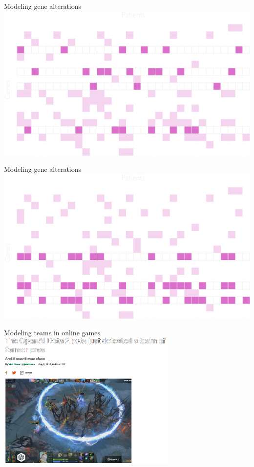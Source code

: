 \documentclass[mathserif]{beamer}
\begin{document}
\begin{frame}{Modeling gene alterations}
\includegraphics[width=\textwidth]{figures/grid_genes_muex.pdf}
\end{frame}


\begin{frame}{Modeling gene alterations}
\includegraphics[width=\textwidth]{figures/grid_genes_cooc.pdf}
\end{frame}


\begin{frame}{Modeling teams in online games}
\vspace{1em}
\centering
\includegraphics[width=3.5in]{figures/openai_dota.png}\\
\end{frame}
\end{document}
